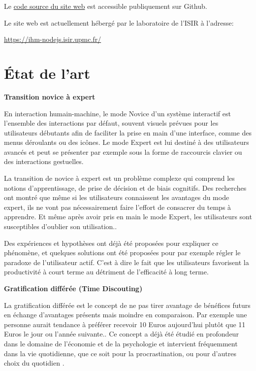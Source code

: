 \documentclass[a4paper, 12pt]{report}
\begin{document}
    
    Le \href{https://github.com/KomeRice/temporal-discounting/tree/master}{code source du site web} est 
    accessible publiquement sur Github. 
    
    Le site web est actuellement hébergé par le laboratoire de l'ISIR à l'adresse: 
    
    \href{https://ihm-nodejs.isir.upmc.fr/}{https://ihm-nodejs.isir.upmc.fr/}
    
    
    \chapter{État de l'art}
    \textbf{Transition novice à expert}
    
    En interaction humain-machine, le mode Novice d'un système interactif est l'ensemble des interactions 
    par défaut, souvent visuels prévues pour les utilisateurs débutants afin de faciliter
    la prise en main d'une interface, comme des menus déroulants ou des icônes. 
    Le mode Expert est lui destiné à des utilisateurs avancés et peut se présenter par exemple
    sous la forme de raccourcis clavier ou des interactions gestuelles.
    
    La transition de novice à expert est un problème complexe qui comprend les notions d'apprentissage, de 
    prise de décision et de biais cognitifs.
    Des recherches \cite{carroll5} ont montré que même si les utilisateurs connaissent les avantages du 
    mode expert, ils ne vont pas nécessairement faire l'effort de consacrer du temps à apprendre. Et même
    après avoir pris en main le mode Expert, les utilisateurs sont 
    susceptibles d'oublier son utilisation.\cite{lafreniere2017investigating}.
    
    Des expériences\cite{augenblick2019experiment} et hypothèses\cite{lane2005hidden} ont déjà été 
    proposées pour expliquer ce phénomène, et quelques solutions ont été proposées pour par exemple
    régler le paradoxe de l'utilisateur actif.\cite{krisler2008training} C'est à dire le fait que les 
    utilisateurs favorisent la productivité à court terme au détriment de l'efficacité à long terme.
    
    \textbf{Gratification différée (Time Discouting)}
    
    La gratification différée est le concept de ne pas tirer avantage de bénéfices futurs en échange  
    d'avantages présents mais moindre en comparaison.
    Par exemple une personne aurait tendance à préférer recevoir 10 Euros aujourd'hui plutôt que 11 Euros 
    le jour ou l'année suivante.\cite{frederick2002time}.
    Ce concept a déjà été étudié en profondeur dans le domaine de l'économie 
    \cite{chapman1996temporal,chapman1995valuing,green1997rate} et de la 
    psychologie\cite{ainslie1975specious} et intervient fréquemment dans la vie quotidienne, que ce soit 
    pour la procrastination\cite{fischer2001read}, ou pour d'autres choix du quotidien 
    \cite{baker2003delay}.
    
\end{document}
